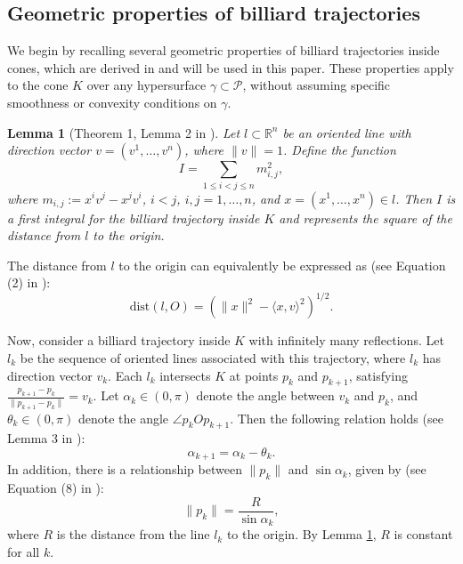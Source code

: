 \documentclass[12pt]{article}
\newtheorem{lemma}{Lemma}
\begin{document}
\subsection{Geometric properties of billiard trajectories}  
We begin by recalling several geometric properties of billiard trajectories inside cones, which are derived in \cite{MY} and will be used in this paper. These properties apply to the cone $K$ over any hypersurface $\gamma \subset \mathcal{P}$, without assuming specific smoothness or convexity conditions on $\gamma$. 

\begin{lemma}[Theorem 1, Lemma 2 in \cite{MY}]\label{lem:int-dis}  
  Let $l \subset \mathbb{R}^n$ be an oriented line with direction vector ${v} = (v^1, \ldots, v^n)$, where $\|{v}\| = 1$. Define the function  
  $$
  I = \sum_{1 \leq i < j \leq n} m_{i,j}^2, 
  $$  
  where $m_{i,j} := x^i v^j - x^j v^i$, $i < j$, $i,j = 1, \ldots, n$, and $x=(x^1, \ldots, x^n) \in l$.  
  Then $I$ is a first integral for the billiard trajectory inside $K$ and represents the square of the distance from $l$ to the origin.
  \end{lemma} 
The distance from $l$ to the origin can equivalently be expressed as (see Equation (2) in \cite{MY}):
\begin{equation}\label{eqdistance}  
\text{dist}(l, O) = \left(\|x\|^2 - \langle x, {v} \rangle^2 \right)^{1/2}.
\end{equation}  

Now, consider a billiard trajectory inside $K$ with infinitely many reflections.  
Let $l_k$ be the sequence of oriented lines associated with this trajectory, where $l_k$ has direction vector ${v}_{k}$. Each $l_k$ intersects $K$ at points $p_k$ and $p_{k+1}$, satisfying  
$
\frac{p_{k+1} - p_k}{\|p_{k+1} - p_k\|} = {v}_{k}.
$
Let $\alpha_k \in (0, \pi)$ denote the angle between ${v}_{k}$ and $p_k$, and $\theta_k \in (0, \pi)$ denote the angle $\angle p_k O p_{k+1}$. Then the following relation holds (see Lemma 3 in \cite{MY}): 
\begin{equation}\label{eq:alpha-theta}  
\alpha_{k+1} = \alpha_k - \theta_k.  
\end{equation}  
In addition, there is a relationship between $\|p_k\|$ and $\sin \alpha_k$, given by (see Equation (8) in \cite{MY}):
\begin{equation}\label{eq:sin-p1}  
\|p_k\| = \frac{R}{\sin \alpha_k},  
\end{equation}  
where $R$ is the distance from the line $l_k$ to the origin. By Lemma \ref{lem:int-dis}, $R$ is constant for all $k$.  
  
\end{document}
